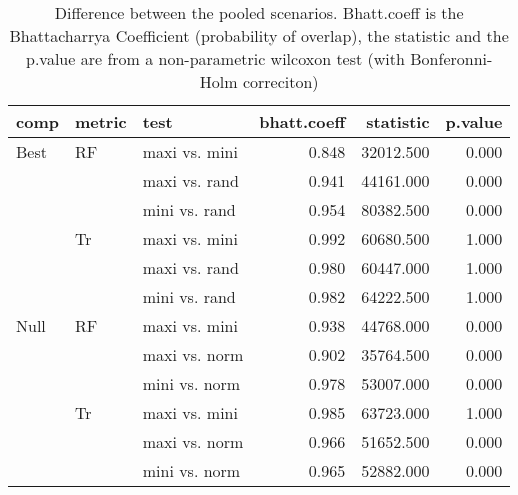 \begin{table}[ht]
\centering
\begin{tabular}{lllrrr}
  \hline
comp & metric & test & bhatt.coeff & statistic & p.value \\ 
  \hline
Best & RF & maxi vs. mini & 0.848 & 32012.500 & 0.000 \\ 
   &  & maxi vs. rand & 0.941 & 44161.000 & 0.000 \\ 
   &  & mini vs. rand & 0.954 & 80382.500 & 0.000 \\ 
   & Tr & maxi vs. mini & 0.992 & 60680.500 & 1.000 \\ 
   &  & maxi vs. rand & 0.980 & 60447.000 & 1.000 \\ 
   &  & mini vs. rand & 0.982 & 64222.500 & 1.000 \\ 
  Null & RF & maxi vs. mini & 0.938 & 44768.000 & 0.000 \\ 
   &  & maxi vs. norm & 0.902 & 35764.500 & 0.000 \\ 
   &  & mini vs. norm & 0.978 & 53007.000 & 0.000 \\ 
   & Tr & maxi vs. mini & 0.985 & 63723.000 & 1.000 \\ 
   &  & maxi vs. norm & 0.966 & 51652.500 & 0.000 \\ 
   &  & mini vs. norm & 0.965 & 52882.000 & 0.000 \\ 
   \hline
\end{tabular}
\caption{Difference between the pooled scenarios. Bhatt.coeff is the Bhattacharrya Coefficient (probability of overlap), the statistic and the p.value are from a non-parametric wilcoxon test (with Bonferonni-Holm correciton)} 
\label{Full_Tab_pooledscenarios_test}
\end{table}
